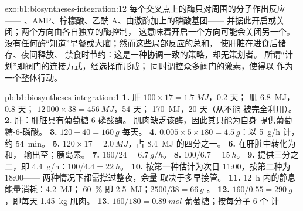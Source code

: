 \begin{solution}{exo:b1:biosyntheses-integration:12}
每个交叉点上的酶只对周围的分子作出反应——
、AMP、柠檬酸、乙酰 A、由激酶加上的磷酸基团——
并据此开启或关闭；两个方向由各自独立的酶控制，
这意味着开启一个方向可能会关闭另一个。
没有任何酶“知道”早餐或大脑；然而这些局部反应的总和，
使肝脏在进食后储存、夜间释放、
禁食时节约：这是一种协调一致的策略，却无策划者。
所谓“计划”即阀门的连接方式，经选择而形成；
同时调控众多阀门的激素，使得以
作为一个整体行动。
\end{solution}

\begin{solution}{pb:b1:biosyntheses-integration:1}
\textbf{1.} 肝 $100\times 17 = \qty{1.7}{MJ}$，0.2 天；
肌 \qty{6.8}{MJ}，0.8 天； $12\,000\times 38 =
\qty{456}{MJ}$，54 天； \qty{170}{MJ}，20 天（从不能
被完全利用）。
\textbf{2.} 肝：肝脏具有葡萄糖-6-磷酸酶。
肌肉缺乏该酶，因此其只能为自身
提供葡萄糖-6-磷酸。
\textbf{3.} $120 + 40 = \qty{160}{g}$ 每天。
\textbf{4.} $0.005\times 5\times 180 = \qty{4.5}{g}$：以 \qty{5}{g/h} 计，约 \qty{54}{min}。
\textbf{5.} $120\times 17 = \qty{2.0}{MJ}$，占 \qty{8.4}{MJ} 的四分之一。
\textbf{6.} 在肝脏中转化为和，
输出至；胰岛素。
\textbf{7.} $160/24 = \qty{6.7}{g/h}$。
\textbf{8.} $100/6.7 = \qty{15}{h}$。
\textbf{9.} 提供三分之二，即 \qty{4.4}{g/h}：$100/4.4 =
\qty{22}{h}$。
\textbf{10.} 按第一种估计为次日 11:00，按第二种为 18:00——
两种情况下都需撑过整夜，余量
取决于多早接管。
\textbf{11.} \qty{12}{h} 内的静息能量消耗：\qty{4.2}{MJ}；
\qty{60}{\%} 即 \qty{2.5}{MJ}；$2500/38 = \qty{66}{g}$ 。
\textbf{12.} $160/0.55 = \qty{290}{g}$ ，即每天
\qty{1.45}{kg} 肌肉。
\textbf{13.} $160/180 = \qty{0.89}{mol}$ 葡萄糖；按每分子 6 个  计

\end{solution}
